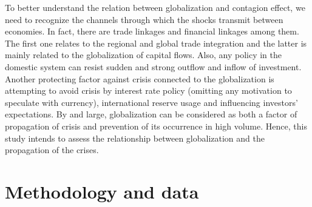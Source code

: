 \documentclass{article}
\begin{document}
To better understand the relation between globalization and contagion effect, we need to recognize the channels through which the shocks transmit between economies. In fact, there are trade linkages and financial linkages among them. The first one relates to the regional and global trade integration and the latter is mainly related to the globalization of capital flows. Also, any policy in the domestic system can resist sudden and strong outflow and inflow of investment. Another protecting factor against crisis connected to the globalization is attempting to avoid crisis by interest rate policy (omitting any motivation to speculate with currency), international reserve usage and influencing investors’ expectations. By and large, globalization can be considered as both a factor of propagation of crisis and prevention of its occurrence in high volume. Hence, this study intends to assess the relationship between globalization and the propagation of the crises. \\
\section*{Methodology and data}
\end{document}
